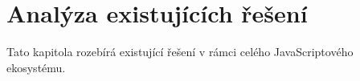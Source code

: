 \chapter{Analýza existujících řešení}

Tato kapitola rozebírá existující řešení v rámci celého JavaScriptového ekosystému.
